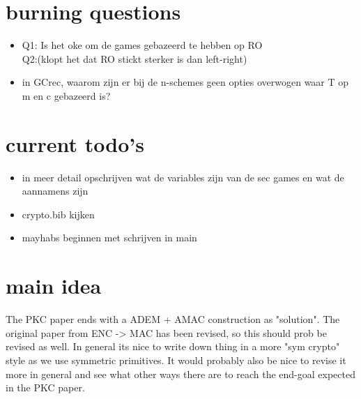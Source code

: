 \documentclass{article}
\begin{document}
\newpage
\section{burning questions}
\begin{itemize}
   \item Q1: Is het oke om de games gebazeerd te hebben op RO\\
   Q2:(klopt het dat RO stickt sterker is dan left-right)
   \item in GCrec, waarom zijn er bij de n-schemes geen opties overwogen waar T op m en c gebazeerd is?
\end{itemize}

\newpage
\section{current todo's}
\begin{itemize}
    \item in meer detail opschrijven wat de variables zijn van de sec games en wat de aannamens zijn
    \item crypto.bib kijken
    \item mayhabs beginnen met schrijven in main
\end{itemize}
\newpage
\section{main idea}
The PKC paper ends with a ADEM + AMAC construction as "solution". The original paper from ENC -> MAC has been revised, so this should prob be revised as well. In general its nice to write down thing in a more "sym crypto" style as we use symmetric primitives. It would probably also be nice to revise it more in general and see what other ways there are to reach the end-goal expected in the PKC paper.
\end{document}
